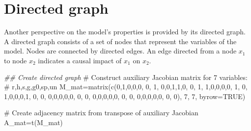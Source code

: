 \documentclass[
  letterpaper,
  DIV=11,
  numbers=noendperiod]{scrreprt}
\newenvironment{Shaded}{\begin{snugshade}}{\end{snugshade}}
\newcommand{\AttributeTok}[1]{\textcolor[rgb]{0.40,0.45,0.13}{#1}}
\newcommand{\CommentTok}[1]{\textcolor[rgb]{0.37,0.37,0.37}{#1}}
\newcommand{\ConstantTok}[1]{\textcolor[rgb]{0.56,0.35,0.01}{#1}}
\newcommand{\DecValTok}[1]{\textcolor[rgb]{0.68,0.00,0.00}{#1}}
\newcommand{\DocumentationTok}[1]{\textcolor[rgb]{0.37,0.37,0.37}{\textit{#1}}}
\newcommand{\FunctionTok}[1]{\textcolor[rgb]{0.28,0.35,0.67}{#1}}
\newcommand{\NormalTok}[1]{\textcolor[rgb]{0.00,0.23,0.31}{#1}}
\newcommand{\OtherTok}[1]{\textcolor[rgb]{0.00,0.23,0.31}{#1}}
\begin{document}
\section{Directed graph}\label{directed-graph-4}

Another perspective on the model's properties is provided by its
directed graph. A directed graph consists of a set of nodes that
represent the variables of the model. Nodes are connected by directed
edges. An edge directed from a node \(x_1\) to node \(x_2\) indicates a
causal impact of \(x_1\) on \(x_2\).

\begin{Shaded}
\begin{Highlighting}[]
\DocumentationTok{\#\# Create directed graph }
\CommentTok{\# Construct auxiliary Jacobian matrix for 7 variables: }
             \CommentTok{\# r,h,s,g,g0,sp,un}
\NormalTok{M\_mat}\OtherTok{=}\FunctionTok{matrix}\NormalTok{(}\FunctionTok{c}\NormalTok{(}\DecValTok{0}\NormalTok{,}\DecValTok{1}\NormalTok{,}\DecValTok{0}\NormalTok{,}\DecValTok{0}\NormalTok{,}\DecValTok{0}\NormalTok{, }\DecValTok{0}\NormalTok{, }\DecValTok{1}\NormalTok{,}
               \DecValTok{0}\NormalTok{,}\DecValTok{0}\NormalTok{,}\DecValTok{1}\NormalTok{,}\DecValTok{1}\NormalTok{,}\DecValTok{0}\NormalTok{, }\DecValTok{0}\NormalTok{, }\DecValTok{1}\NormalTok{,}
               \DecValTok{1}\NormalTok{,}\DecValTok{0}\NormalTok{,}\DecValTok{0}\NormalTok{,}\DecValTok{0}\NormalTok{,}\DecValTok{0}\NormalTok{, }\DecValTok{1}\NormalTok{, }\DecValTok{0}\NormalTok{,}
               \DecValTok{1}\NormalTok{,}\DecValTok{0}\NormalTok{,}\DecValTok{0}\NormalTok{,}\DecValTok{0}\NormalTok{,}\DecValTok{1}\NormalTok{, }\DecValTok{0}\NormalTok{, }\DecValTok{0}\NormalTok{,}
               \DecValTok{0}\NormalTok{,}\DecValTok{0}\NormalTok{,}\DecValTok{0}\NormalTok{,}\DecValTok{0}\NormalTok{,}\DecValTok{0}\NormalTok{, }\DecValTok{0}\NormalTok{, }\DecValTok{0}\NormalTok{,}
               \DecValTok{0}\NormalTok{,}\DecValTok{0}\NormalTok{,}\DecValTok{0}\NormalTok{,}\DecValTok{0}\NormalTok{,}\DecValTok{0}\NormalTok{, }\DecValTok{0}\NormalTok{, }\DecValTok{0}\NormalTok{,}
               \DecValTok{0}\NormalTok{,}\DecValTok{0}\NormalTok{,}\DecValTok{0}\NormalTok{,}\DecValTok{0}\NormalTok{,}\DecValTok{0}\NormalTok{, }\DecValTok{0}\NormalTok{, }\DecValTok{0}\NormalTok{), }\DecValTok{7}\NormalTok{, }\DecValTok{7}\NormalTok{, }\AttributeTok{byrow=}\ConstantTok{TRUE}\NormalTok{)}

\CommentTok{\# Create adjacency matrix from transpose of auxiliary Jacobian }
\NormalTok{A\_mat}\OtherTok{=}\FunctionTok{t}\NormalTok{(M\_mat)}


\end{Highlighting}
\end{Shaded}
\end{document}
